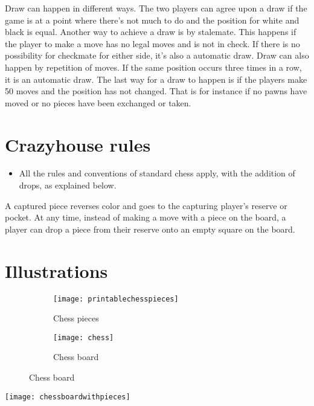 \documentclass{article}
\begin{document}
\begin{description}[align=right]
\item [Draw:] \hspace{6mm} Draw can happen in different ways. The two players can agree upon a draw if the game is at a point where there's not much to do and the position for white and black is equal. Another way to achieve a draw is by stalemate. This happens if the player to make a move has no legal moves and is not in check. If there is no possibility for checkmate for either side, it's also a automatic draw. Draw can also happen by repetition of moves. If the same position occurs three times in a row, it is an automatic draw. The last way for a draw to happen is if the players make 50 moves and the position has not changed. That is for instance if no pawns have moved or no pieces have been exchanged or taken.
\end{description}
\section{Crazyhouse rules}
\begin{itemize}
\item All the rules and conventions of standard chess apply, with the addition of drops, as explained below.
\end{itemize}
\begin{description}[align=right]
\item [Drop:] \hspace{6mm} A captured piece reverses color and goes to the capturing player's reserve or pocket. At any time, instead of making a move with a piece on the board, a player can drop a piece from their reserve onto an empty square on the board.
\end{description}


\section{Illustrations}
\begin{figure} [h!]
	\begin{subfigure}[b]{0.5\textwidth}
		\texttt{[image: printablechesspieces]}
        \caption{Chess pieces}
        \label{fig:printablechesspieces}
	\end{subfigure}
    \begin{subfigure}[b]{0.5\textwidth}
		\texttt{[image: chess]}
        \caption{Chess board}
        \label{fig:chess}
	\end{subfigure}

\end{figure}
\texttt{[image: chessboardwithpieces]}
\end{document}
